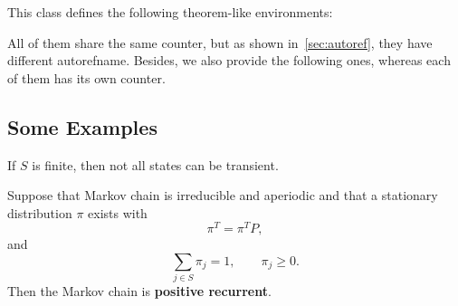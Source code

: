 \documentclass[11pt]{arxiv}
\begin{document}
This class defines the following theorem-like environments: 
All of them share the same counter, but as shown in~\autoref{sec:autoref}, they have different {\code autorefname}. 
Besides, we also provide the following ones, whereas each of them has its own counter.

\subsection{Some Examples}\label{subsec: theorem-like-env-examples}

\begin{proposition}\label{proposition: not-all-transient}
If $S$ is finite, then not all states can be transient. 
\end{proposition}

\begin{theorem}\label{thm: positive-recurrent}
Suppose that Markov chain is irreducible and aperiodic and that a stationary distribution $\pi$ exists with
\begin{equation}\label{eq: stationary-dist}
\pi^T = \pi^T P,
\end{equation}
and
\begin{equation}\label{eq: sum-to-1}
\sum_{j \in S}\pi_j = 1,\qquad \pi_j \ge 0.
\end{equation}
Then the Markov chain is {\bf positive recurrent}.
\end{theorem}
\end{document}
